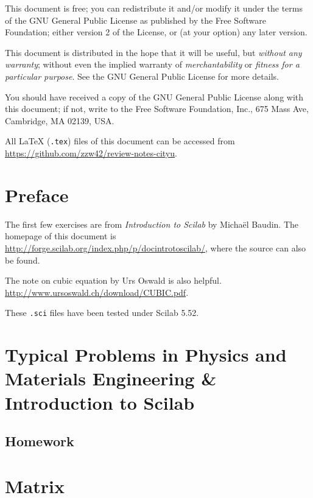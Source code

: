 \documentclass[openany]{book}
\begin{document}
\begin{titlepage}

\vfill %
\end{titlepage}

\noindent

This document is free; you can redistribute it and/or modify it under the terms of 
the GNU General Public License as published by the Free Software Foundation; either 
version 2 of the License, or (at your option) any later version.

This document is distributed in the hope that it will be useful, but \emph{without any 
warranty}; without even the implied warranty of \emph{merchantability} or \emph{fitness 
for a particular purpose}. See the GNU General Public License for more details.

You should have received a copy of the GNU General Public License along with this document; 
if not, write to the Free Software Foundation, Inc., 675 Mass Ave, Cambridge, MA 02139, USA.

All \LaTeX{} (\texttt{.tex}) files of this document can be accessed from
\url{https://github.com/zzw42/review-notes-cityu}.


\tableofcontents

\chapter*{Preface}
The first few exercises are from \emph{Introduction to Scilab} by Micha\"{e}l Baudin.
The homepage of this document is 
\url{http://forge.scilab.org/index.php/p/docintrotoscilab/}, where the source can also be
found.

The note on cubic equation by Urs Oswald is also 
helpful. \url{http://www.ursoswald.ch/download/CUBIC.pdf}.

These {\tt .sci} files have been tested under Scilab 5.52.
\mainmatter
\chapter{Typical Problems in Physics and Materials Engineering
\& Introduction to Scilab}
\section{Homework}



\chapter{Matrix}
\end{document}
